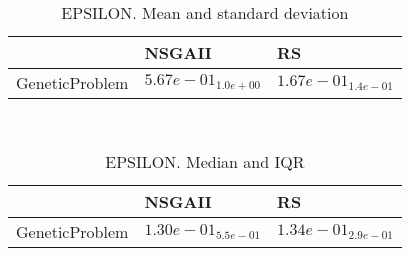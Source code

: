 \documentclass{article}
\begin{document}
\
\begin{table}
\caption{EPSILON. Mean and standard deviation}
\label{table:mean.EPSILON}
\centering
\begin{scriptsize}
\begin{tabular}{lll}
\hline & NSGAII &  RS\\
\hline
GeneticProblem & \cellcolor{gray25}$  5.67e-01_{ 1.0e+00}$ & \cellcolor{gray95}$  1.67e-01_{ 1.4e-01}$ \\
\hline
\end{tabular}
\end{scriptsize}
\end{table}
\
\begin{table}
\caption{EPSILON. Median and IQR}
\label{table:median.EPSILON}
\begin{scriptsize}
\centering
\begin{tabular}{lll}
\hline & NSGAII &  RS\\
\hline
GeneticProblem & \cellcolor{gray95}$  1.30e-01_{ 5.5e-01}$ & $  1.34e-01_{ 2.9e-01}$ \\
\hline
\end{tabular}
\end{scriptsize}
\end{table}
\end{document}
